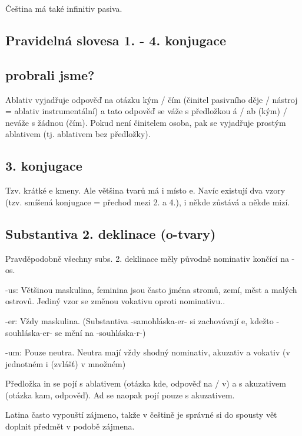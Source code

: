 \documentclass[12pt]{article}					%
\begin{document}
        \begin{upozorneni}
            Čeština má také infinitiv pasiva.
        \end{upozorneni}

    \subsection{Pravidelná slovesa 1. - 4. konjugace}



    \subsection{probrali jsme?}
    Ablativ vyjadřuje odpověď na otázku kým / čím (činitel pasivního děje / nástroj = ablativ instrumentální) a tato odpověď se váže s předložkou á / ab (kým) / neváže s žádnou (čím). Pokud není činitelem osoba, pak se vyjadřuje prostým ablativem (tj. ablativem bez předložky).

    \subsection{3. konjugace}
        Tzv. krátké e kmeny. Ale většina tvarů má i místo e. Navíc existují dva vzory (tzv. smíšená konjugace = přechod mezi 2. a 4.), i někde zůstává a někde mizí.

    \subsection{Substantiva 2. deklinace (o-tvary)}
        Pravděpodobně všechny subs. 2. deklinace měly původně nominativ končící na -os.    

        -us: Většinou maskulina, feminina jsou často jména stromů, zemí, měst a malých ostrovů. Jediný vzor se změnou vokativu oproti nominativu..

        -er: Vždy maskulina. (Substantiva -samohláska-er- si zachovávají e, kdežto -souhláska-er- se mění na -souhláska-r-)

        -um: Pouze neutra. Neutra mají vždy shodný nominativ, akuzativ a vokativ (v jednotném i (zvlášť) v množném)



        Předložka in se pojí s ablativem (otázka kde, odpověď na / v) a s akuzativem (otázka kam, odpověď). Ad se naopak pojí pouze s akuzativem.

        Latina často vypouští zájmeno, takže v češtině je správné si do spousty vět doplnit předmět v podobě zájmena.
\end{document}
